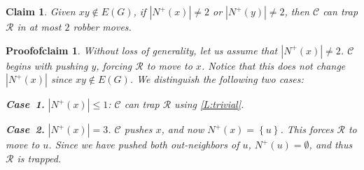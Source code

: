\documentclass[10pt,a4paper]{amsart}
\newtheorem{claim}{Claim}
\newtheorem{proofofclaim}{Proofofclaim}
\newcommand{\C}{\mathcal{C}}
\newcommand{\R}{\mathcal{R}}
\newcommand{\set}[1]{\left\{#1\right\}}
\begin{document}
    \begin{claim}\label{C:neighborvisited}
        Given $xy\notin E(G)$, if $|N^+(x)| \neq 2$ or $|N^+(y)| \neq 2$, then $\C$ can trap $\R$ in at most $2$ robber moves.
    \end{claim}

    \begin{proofofclaim}
        Without loss of generality, let us assume that $|N^+(x)|\neq 2$. $\C$ begins with pushing $y$, forcing $\R$ to move to $x$. Notice that this does not change $|N^+(x)|$ since $xy\notin E(G)$. We distinguish the following two cases:

        \medskip
        \noindent\textbf{Case~1.} $|N^+(x)|\leq 1$: $\C$ can trap $\R$ using \cref{L:trivial}.

        \medskip
        \noindent\textbf{Case~2.} $|N^+(x)| =3$. $\C$ pushes $x$, and now $N^+(x) = \set{u}$. This forces $\R$ to move to $u$. Since we have pushed both out-neighbors of $u$, $N^+(u) = \emptyset$, and thus $\R$ is trapped. 
    \end{proofofclaim}
\end{document}
